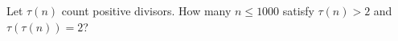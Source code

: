 Let $\tau(n)$ count positive divisors. How many $ n\le1000 $ satisfy $\tau(n)>2 $ and $\tau(\tau(n))=2 $?

